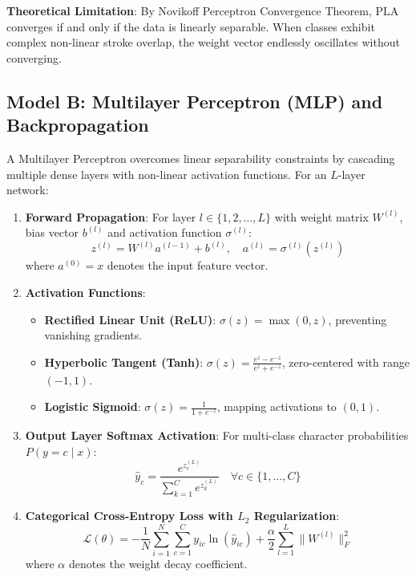 \documentclass[12pt,a4paper]{article}
\begin{document}
\textbf{Theoretical Limitation}: By Novikoff Perceptron Convergence Theorem, PLA converges if and only if the data is linearly separable. When classes exhibit complex non-linear stroke overlap, the weight vector endlessly oscillates without converging.

\subsection{Model B: Multilayer Perceptron (MLP) and Backpropagation}
A Multilayer Perceptron overcomes linear separability constraints by cascading multiple dense layers with non-linear activation functions. For an $L$-layer network:
\begin{enumerate}
\item \textbf{Forward Propagation}: For layer $l \in \{1, 2, \dots, L\}$ with weight matrix $W^{(l)}$, bias vector $b^{(l)}$ and activation function $\sigma^{(l)}$:
\begin{equation}
z^{(l)} = W^{(l)} a^{(l-1)} + b^{(l)}, \quad a^{(l)} = \sigma^{(l)}(z^{(l)})
\end{equation}
where $a^{(0)} = x$ denotes the input feature vector.
\item \textbf{Activation Functions}:
\begin{itemize}
\item \textbf{Rectified Linear Unit (ReLU)}: $\sigma(z) = \max(0, z)$, preventing vanishing gradients.
\item \textbf{Hyperbolic Tangent (Tanh)}: $\sigma(z) = \frac{e^z - e^{-z}}{e^z + e^{-z}}$, zero-centered with range $(-1, 1)$.
\item \textbf{Logistic Sigmoid}: $\sigma(z) = \frac{1}{1 + e^{-z}}$, mapping activations to $(0, 1)$.
\end{itemize}
\item \textbf{Output Layer Softmax Activation}: For multi-class character probabilities $P(y = c \mid x)$:
\begin{equation}
\hat{y}_c = \frac{e^{z_c^{(L)}}}{\sum_{k=1}^C e^{z_k^{(L)}}} \quad \forall c \in \{1, \dots, C\}
\end{equation}
\item \textbf{Categorical Cross-Entropy Loss with $L_2$ Regularization}:
\begin{equation}
\mathcal{L}(\theta) = -\frac{1}{N} \sum_{i=1}^N \sum_{c=1}^C y_{ic} \ln(\hat{y}_{ic}) + \frac{\alpha}{2} \sum_{l=1}^L \| W^{(l)} \|_F^2
\end{equation}
where $\alpha$ denotes the weight decay coefficient.

\end{enumerate}
\end{document}
